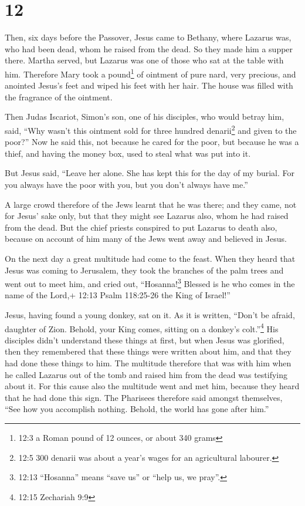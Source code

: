 \hypertarget{section-11}{%
\section{12}\label{section-11}}

 Then, six days before the Passover, Jesus came to Bethany,
where Lazarus was, who had been dead, whom he raised from the dead.
 So they made him a supper there. Martha served, but Lazarus
was one of those who sat at the table with him.  Therefore
Mary took a pound\footnote{12:3 a Roman pound of 12 ounces, or about 340
  grams} of ointment of pure nard, very precious, and anointed Jesus's
feet and wiped his feet with her hair. The house was filled with the
fragrance of the ointment.

 Then Judas Iscariot, Simon's son, one of his disciples, who
would betray him, said,  ``Why wasn't this ointment sold for
three hundred denarii\footnote{12:5 300 denarii was about a year's wages
  for an agricultural labourer.} and given to the poor?'' 
Now he said this, not because he cared for the poor, but because he was
a thief, and having the money box, used to steal what was put into it.

 But Jesus said, ``Leave her alone. She has kept this for
the day of my burial.  For you always have the poor with
you, but you don't always have me.''

 A large crowd therefore of the Jews learnt that he was
there; and they came, not for Jesus' sake only, but that they might see
Lazarus also, whom he had raised from the dead.  But the
chief priests conspired to put Lazarus to death also, 
because on account of him many of the Jews went away and believed in
Jesus.

 On the next day a great multitude had come to the feast.
When they heard that Jesus was coming to Jerusalem,  they
took the branches of the palm trees and went out to meet him, and cried
out, ``Hosanna!\footnote{12:13 ``Hosanna'' means ``save us'' or ``help
  us, we pray''.} Blessed is he who comes in the name of the Lord,+
12:13 Psalm 118:25-26 the King of Israel!''

 Jesus, having found a young donkey, sat on it. As it is
written,  ``Don't be afraid, daughter of Zion. Behold, your
King comes, sitting on a donkey's colt.''\footnote{12:15 Zechariah 9:9}
 His disciples didn't understand these things at first, but
when Jesus was glorified, then they remembered that these things were
written about him, and that they had done these things to him.
 The multitude therefore that was with him when he called
Lazarus out of the tomb and raised him from the dead was testifying
about it.  For this cause also the multitude went and met
him, because they heard that he had done this sign.  The
Pharisees therefore said amongst themselves, ``See how you accomplish
nothing. Behold, the world has gone after him.''

